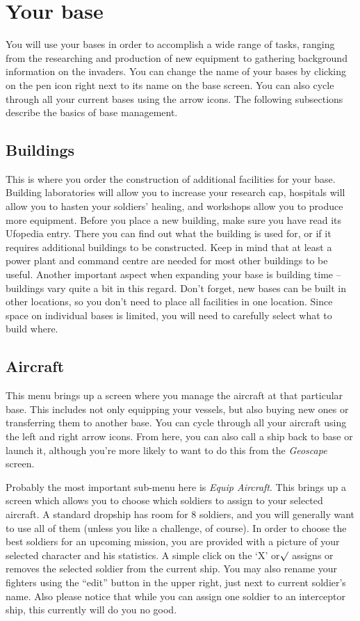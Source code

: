 \section{Your base}
You will use your bases in order to accomplish a wide range of tasks, ranging from the researching and production of new equipment to gathering background information on the invaders. You can change the name of your bases by clicking on the pen icon right next to its name on the base screen. You can also cycle through all your current bases using the arrow icons. The following subsections describe the basics of base management.

\subsection{Buildings}
This is where you order the construction of additional facilities for your base.  Building laboratories will allow you to increase your research cap, hospitals will allow you to hasten your soldiers' healing, and workshops allow you to produce more equipment.  Before you place a new building, make sure you have read its Ufopedia entry. There you can find out what the building is used for, or if it requires additional buildings to be constructed. Keep in mind that at least a power plant and command centre are needed for most other buildings to be useful. Another important aspect when expanding your base is building time -- buildings vary quite a bit in this regard.  Don't forget, new bases can be built in other locations, so you don't need to place all facilities in one location.  Since space on individual bases is limited, you will need to carefully select what to build where.

\subsection{Aircraft}
This menu brings up a screen where you manage the aircraft at that particular base. This includes not only equipping your vessels, but also buying new ones or transferring them to another base. You can cycle through all your aircraft using the left and right arrow icons. From here, you can also call a ship back to base or launch it, although you're more likely to want to do this from the \emph{Geoscape} screen.

Probably the most important sub-menu here is \emph{Equip Aircraft}.  This brings up a screen which allows you to choose which soldiers to assign to your selected aircraft. A standard dropship has room for 8 soldiers, and you will generally want to use all of them (unless you like a challenge, of course). In order to choose the best soldiers for an upcoming mission, you are provided with a picture of your selected character and his statistics. A simple click on the `X' or$\surd$ assigns or removes the selected soldier from the current ship. You may also rename your fighters using the ``edit'' button in the upper right, just next to current soldier's name. Also please notice that while you can assign one soldier to an interceptor ship, this currently will do you no good.

